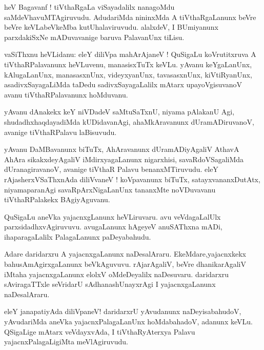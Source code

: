 \documentclass{article}
\begin{document}
\begin{mn}
heV Bagavanf ! tiVthaRgaLa viSayadalilx nanagoMdu saMdeVhavuMTAgiruvudu. AdudariMda nininxMda A 
tiVthaRgaLanunx  beVre beVre keVLabeVkeMba kutUhalaviruvudu. alalxdeV, I BUmiyanunx parxdakiSxNe 
mADuvavanige baruva PalavanUnx tiLisu.
\end{mn}

\begin{mn}
vaSiThxnu heVLidanu: eleY diliVpa mahArAjaneV ! QuSigaLu koVrutitxruva A tiVthaRPalavanunx 
heVLuvenu, manasisxTuTx keVLu. yAvanu keYgaLanUnx, kAlugaLanUnx, manasasxnUnx, videyxyanUnx,
tavasasxnUnx, kiVtiRyanUnx, asadivxSayagaLiMda taDedu sadivxSayagaLalilx mAtarx upayoVgisuvanoV
avanu tiVthaRPalavanunx hoMduvanu. 
\end{mn}

\begin{mn}
yAvanu dAnakekx keY niVDadeV saMtuSaTxnU, niyama pAlakanU Agi, shudadhxhaqdayadiMda kUDidavanAgi,
ahaMkAravanunx dUramADiruvanoV, avanige tiVthaRPalavu laBisuvudu.
\end{mn}

\begin{mn}
yAvanu DaMBavanunx biTuTx, AhAravanunx dUramADiyAgaliV AthavA AhAra sikakxdeyAgaliV 
iMdirxyagaLanunx nigarxhisi, savaRdoVSagaliMda dUranagiravanoV, avanige tiVthaR Palavu 
benanxMTiruvudu. eleY rAjasherxVSaThxnAda diliVvaneV ! koVpavanunx biTuTx, satayxvananxDutAtx, 
niyamaparanAgi savaRpArxNigaLanUnx tananxMte noVDuvavanu tiVthaRPalakekx BAgiyAguvanu.
\end{mn}

\begin{mn}
QuSigaLu aneVka yajacnxgLanunx heVLiruvaru. avu veVdagaLalUlx parxsidadhxvAgiruvuvu. avugaLanunx 
hAgeyeV anuSAThxna mADi, ihaparagaLalilx PalagaLanunx paDeyabahudu.
\end{mn}

\begin{mn}
Adare daridarxru A yajacnxgaLanunx naDesalAraru. EkeMdare,yajacnxkekx bahusAmAgirxgaLanunx 
beVkAguvuvu.
rAjarAgaliV, beVre dhanikarAgaliV iMtaha yajacnxgaLanunx elolxV oMdeDeyalilx naDesuvaru. 
daridarxru sAviragaTTxle seVridarU sAdhanashUnayxrAgi I yajacnxgaLanunx naDesalAraru.
\end{mn}


\begin{mn}
eleY janapatiyAda diliVpaneV! daridarxrU yAvudanunx naDeyisabahudoV, yAvudariMda aneVka 
yajacnxPalagaLanUnx hoMdabahadoV, adanunx keVLu. QSigaLige mAtarx veVdayxvAda, I tiVthaRyAterxya 
Palavu yajacnxPalagaLigiMta meVlAgiruvudu.
\end{mn}
\end{document}

